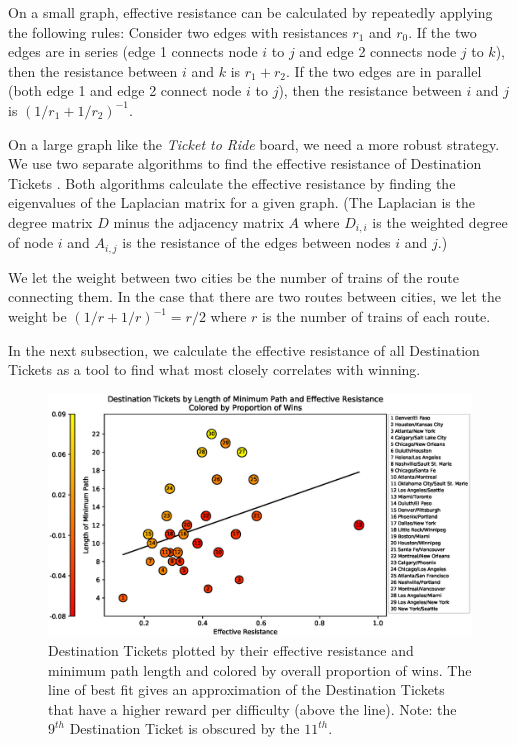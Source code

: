 \begin{multicols}{2}
On a small graph, effective resistance can be calculated
by repeatedly applying the following rules:
Consider two edges with resistances $r_1$ and $r_0$.
If the two edges are in series (edge 1 connects node $i$ to $j$
and edge 2 connects node $j$ to $k$), then the resistance between
$i$ and $k$ is $r_1 + r_2$.
If the two edges are in parallel (both edge 1 and edge 2 connect
node $i$ to $j$), then the resistance between $i$ and $j$
is $(1/r_1 + 1/r_2)^{-1}$.

On a large graph like the \textit{Ticket to Ride} board, 
we need a more robust strategy.
We use two separate algorithms to find the effective resistance
of Destination Tickets
\cite{ellens2011effective, wu2004theory}.
Both algorithms calculate the effective resistance by finding 
the eigenvalues of the Laplacian matrix for a given graph.
(The Laplacian is the degree matrix $D$ minus the adjacency
matrix $A$ where $D_{i,i}$ is the weighted degree of node $i$
and $A_{i,j}$ is the resistance of the edges between nodes
$i$ and $j$.)

We let the weight between two cities be the number
of trains of the route connecting them.
In the case that there are two routes between cities,
we let the weight be $(1/r + 1/r)^{-1}=r/2$ where
$r$ is the number of trains of each route.

In the next subsection, we calculate the effective
resistance of all Destination Tickets as a tool
to find what most closely correlates with winning.

\end{multicols}
\begin{figure}
    \centering
    \includegraphics[scale=.69]{figures/resistance_aggregate}
    \caption{Destination Tickets plotted by their effective
    resistance and minimum path length and colored
    by overall proportion of wins.
    The line of best fit gives an approximation of the
    Destination Tickets that have a higher reward per difficulty
    (above the line).
    Note: the $9^{th}$ Destination Ticket 
    is obscured by the $11^{th}$.}
    \label{fig:resistance}
\end{figure}

